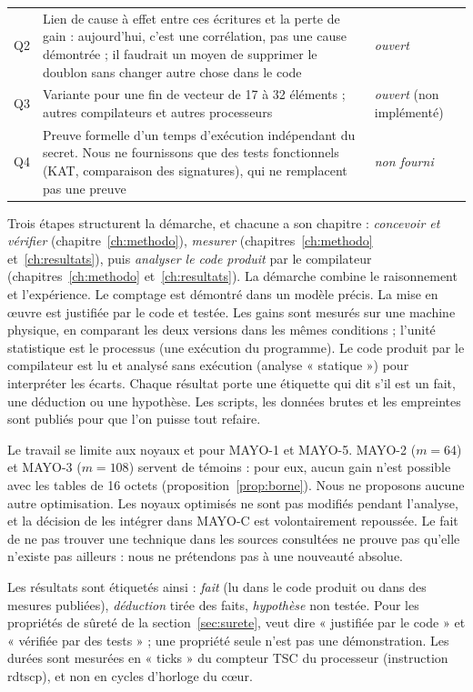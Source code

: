 \begin{table}[ht]
\begin{tabularx}{\linewidth}{@{}lXl@{}}
Q2 & Lien de cause à effet entre ces écritures et la perte de gain : aujourd'hui, c'est une corrélation, pas une cause démontrée ; il faudrait un moyen de supprimer le doublon sans changer autre chose dans le code & \emph{ouvert}\\
Q3 & Variante pour une fin de vecteur de 17 à 32 éléments ; autres compilateurs et autres processeurs & \emph{ouvert} (non implémenté)\\
Q4 & Preuve formelle d'un temps d'exécution indépendant du secret. Nous ne fournissons que des tests fonctionnels (KAT, comparaison des signatures), qui ne remplacent pas une preuve & \emph{non fourni}\\\bottomrule
\end{tabularx}
\end{table}
Trois étapes structurent la démarche, et chacune a son chapitre : \emph{concevoir et vérifier} (chapitre~\ref{ch:methodo}), \emph{mesurer} (chapitres~\ref{ch:methodo} et~\ref{ch:resultats}), puis \emph{analyser le code produit} par le compilateur (chapitres~\ref{ch:methodo} et~\ref{ch:resultats}).
La démarche combine le raisonnement et l'expérience. Le comptage est démontré dans un modèle précis. La mise en œuvre est justifiée par le code et testée. Les gains sont mesurés sur une machine physique, en comparant les deux versions dans les mêmes conditions ; l'unité statistique est le processus (une exécution du programme). Le code produit par le compilateur est lu et analysé sans exécution (analyse « statique ») pour interpréter les écarts. Chaque résultat porte une étiquette qui dit s'il est un fait, une déduction ou une hypothèse. Les scripts, les données brutes et les empreintes sont publiés pour que l'on puisse tout refaire.

Le travail se limite aux noyaux  et  pour MAYO-1 et MAYO-5. MAYO-2 ($m=64$) et MAYO-3 ($m=108$) servent de témoins : pour eux, aucun gain n'est possible avec les tables de 16 octets (proposition~\ref{prop:borne}). Nous ne proposons aucune autre optimisation. Les noyaux optimisés ne sont pas modifiés pendant l'analyse, et la décision de les intégrer dans MAYO-C est volontairement repoussée. Le fait de ne pas trouver une technique dans les sources consultées ne prouve pas qu'elle n'existe pas ailleurs : nous ne prétendons pas à une nouveauté absolue.

Les résultats sont étiquetés ainsi : \F{} \emph{fait} (lu dans le code produit ou dans des mesures publiées), \I{} \emph{déduction} tirée des faits, \Hy{} \emph{hypothèse} non testée. Pour les propriétés de sûreté de la section~\ref{sec:surete}, \Pc{} veut dire « justifiée par le code » et \Pe{} « vérifiée par des tests » ; une propriété \Pe{} seule n'est pas une démonstration. Les durées sont mesurées en « ticks » du compteur TSC du processeur (instruction rdtscp), et non en cycles d'horloge du cœur.

